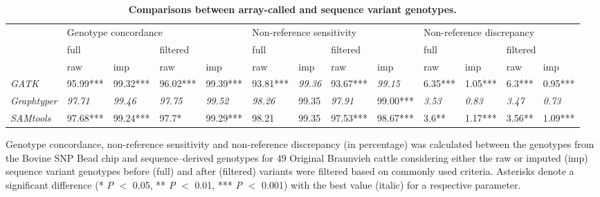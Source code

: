 \documentclass[../main.tex]{subfiles}
\begin{document}
\begin{landscape}
    \begin{table}
        \centering
        \caption{\textbf{Comparisons between array-called and sequence variant genotypes. }}
        \small
        \begin{tabular}{|l|l|l|l|l|l|l|l|l|l|l|l|l|} 
        \cline{2-13}
        \multicolumn{1}{l|}{\multirow{3}{*}{~}} & \multicolumn{4}{l|}{Genotype concordance}                         & \multicolumn{4}{l|}{Non-reference sensitivity}                    & \multicolumn{4}{l|}{Non-reference discrepancy}                 \\ 
        \cline{2-13}
        \multicolumn{1}{l|}{}                   & \multicolumn{2}{l|}{full}       & \multicolumn{2}{l|}{filtered}   & \multicolumn{2}{l|}{full}       & \multicolumn{2}{l|}{filtered}   & \multicolumn{2}{l|}{full}     & \multicolumn{2}{l|}{filtered}  \\ 
        \cline{2-13}
        \multicolumn{1}{l|}{}                   & raw            & imp            & raw            & imp            & raw            & imp            & raw            & imp            & raw           & imp           & raw           & imp            \\ 
        \arrayrulecolor{black}\cline{1-1}\arrayrulecolor{black}\cline{2-13}
        \textit{GATK}                           & 95.99***       & 99.32***       & 96.02***       & 99.39***       & 93.81***       & \textit{99.36} & 93.67***       & \textit{99.15} & 6.35***       & 1.05***       & 6.3***        & 0.95***        \\ 
        \hline
        \textit{Graphtyper}                     & \textit{97.71} & \textit{99.46} & \textit{97.75} & \textit{99.52} & \textit{98.26} & 99.35          & \textit{97.91} & 99.00***       & \textit{3.53} & \textit{0.83} & \textit{3.47} & \textit{0.73}  \\ 
        \hline
        \textit{SAMtools}                       & 97.68***       & 99.24***       & 97.7*          & 99.29***       & 98.21          & 99.35          & 97.53***       & 98.67***       & 3.6**         & 1.17***       & 3.56**        & 1.09***        \\
        \hline
        \end{tabular}
        \label{tab:varcomp}
        \end{table}
        \singlespacing
        \small{Genotype concordance, non-reference sensitivity and non-reference discrepancy (in percentage) was calculated between 
        the genotypes from the Bovine SNP Bead chip and sequence–derived genotypes for 49 Original Braunvieh cattle considering either the raw or imputed (imp) sequence variant 
        genotypes before (full) and after (filtered) variants were filtered based on commonly used criteria. 
        Asterisks denote a significant difference (* \emph{P} $<$ 0.05, ** \emph{P} $<$ 0.01, *** \emph{P} $<$ 0.001) with the best value (italic) for a respective parameter.}

\end{landscape}
\end{document}
